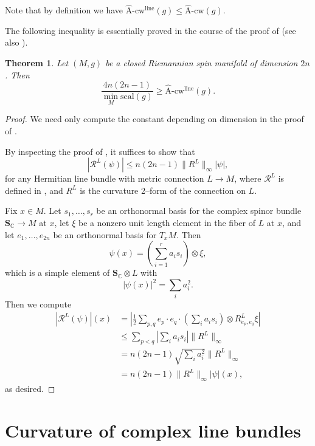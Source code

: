 \documentclass[12pt]{amsart}
\newtheorem{theorem}{Theorem}[section]
\theoremstyle{definition}
\numberwithin{equation}{section}
\newcommand{\C}{\mathbb{C}}
\newcommand{\acw}{\hat{\mathrm{A}}\text{-}\mathrm{cw}}
\begin{document}
Note that by definition we have $\acw^{\mathrm{line}}(g) \leq \acw(g)$.

The following inequality is essentially proved in the course of the proof of \cite[Theorem 5$\frac{1}{4}$]{Gromov:K-area} (see also \cite[\S1]{Wang:cowaist}).

\begin{theorem}\label{thm:spin-quant}
Let $(M, g)$ be a closed Riemannian spin manifold of dimension $2n$. Then
\[ \frac{4n(2n-1)}{\min_M\mathrm{scal}(g)} \geq \acw^{\mathrm{line}}(g). \]
\end{theorem}
\begin{proof}
We need only compute the constant depending on dimension in the proof of \cite[Theorem 5$\frac{1}{4}$]{Gromov:K-area}.

By inspecting the proof of \cite[Theorem 5$\frac{1}{4}$]{Gromov:K-area}, it suffices to show that
\begin{equation}\label{eqn:line} |\mathcal{R}^L(\psi)| \leq n(2n-1)\|R^L\|_{\infty}|\psi|, \end{equation}
for any Hermitian line bundle with metric connection $L \to M$, where $\mathcal{R}^L$ is defined in \cite[Chapter II, (8.22)]{Lawson-Michelson:spin}, and $R^L$ is the curvature 2--form of the connection on $L$.

Fix $x \in M$. Let $s_1, \hdots, s_r$ be an orthonormal basis for the complex spinor bundle $\mathbf{S}_\C \to M$ at $x$, let $\xi$ be a nonzero unit length element in the fiber of $L$ at $x$, and let $e_1, \hdots, e_{2n}$ be an orthonormal basis for $T_xM$. Then
\[ \psi(x) = \left(\sum_{i=1}^r a_is_i\right) \otimes \xi, \]
which is a simple element of $\mathbf{S}_\C\otimes L$ with
\[ |\psi(x)|^2 = \sum_i a_i^2. \]
Then we compute
\begin{align*}
|\mathcal{R}^L(\psi)|(x)
& = \left|\frac{1}{2}\sum_{p,q} e_p\cdot e_q \cdot \left(\sum_i a_is_i\right) \otimes R^L_{e_p, e_q}\xi \right|\\
& \leq \sum_{p < q} \left|\sum_i a_is_i\right|\|R^L\|_{\infty} \\
& = n(2n-1)\sqrt{\sum_i a_i^2}\|R^L\|_{\infty}\\
& = n(2n-1)\|R^L\|_{\infty}|\psi|(x),
\end{align*}
as desired.
\end{proof}






\section{Curvature of complex line bundles}\label{sec:chern-weil}
\end{document}
